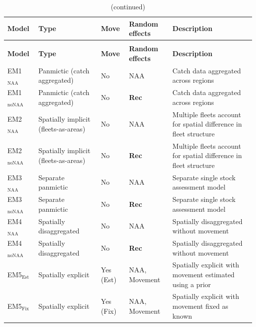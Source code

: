 \begin{landscape}
\begin{longtable}{p{3cm} p{6cm} p{2cm} p{3.5cm} p{5.5cm}}  
  \caption{Descriptions of 10 estimation models} \label{EM_tabel} \\
  \toprule
  \textbf{Model} & \textbf{Type} & \textbf{Move} & \textbf{Random effects} & \textbf{Description} \\
  \midrule
  \endfirsthead
  \caption[]{(continued)} \\
  \toprule
  \textbf{Model} & \textbf{Type} & \textbf{Move} & \textbf{Random effects} & \textbf{Description} \\
  \midrule
  \endhead
  \bottomrule
  \endfoot

  EM1$_{\text{NAA}}$ & Panmictic (catch aggregated) & No & NAA & Catch data aggregated across regions \\
  EM1$_{\text{noNAA}}$ & Panmictic (catch aggregated) & No & \textbf{Rec} & Catch data aggregated across regions \\
  EM2$_{\text{NAA}}$ & Spatially implicit (fleets-as-areas) & No & NAA & Multiple fleets account for spatial difference in fleet structure \\
  EM2$_{\text{noNAA}}$ & Spatially implicit (fleets-as-areas) & No & \textbf{Rec} & Multiple fleets account for spatial difference in fleet structure \\
  EM3$_{\text{NAA}}$ & Separate panmictic & No & NAA & Separate single stock assessment model \\
  EM3$_{\text{noNAA}}$ & Separate panmictic & No & \textbf{Rec} & Separate single stock assessment model \\
  EM4$_{\text{NAA}}$ & Spatially disaggregated & No & NAA & Spatially disaggregated without movement \\
  EM4$_{\text{noNAA}}$ & Spatially disaggregated & No & \textbf{Rec} & Spatially disaggregated without movement \\
  EM5$_{\text{Est}}$ & Spatially explicit & Yes (Est) & NAA, Movement & Spatially explicit with movement estimated using a prior \\
  EM5$_{\text{Fix}}$ & Spatially explicit & Yes (Fix) & NAA, Movement & Spatially explicit with movement fixed as known \\
  
\end{longtable}
\end{landscape}
